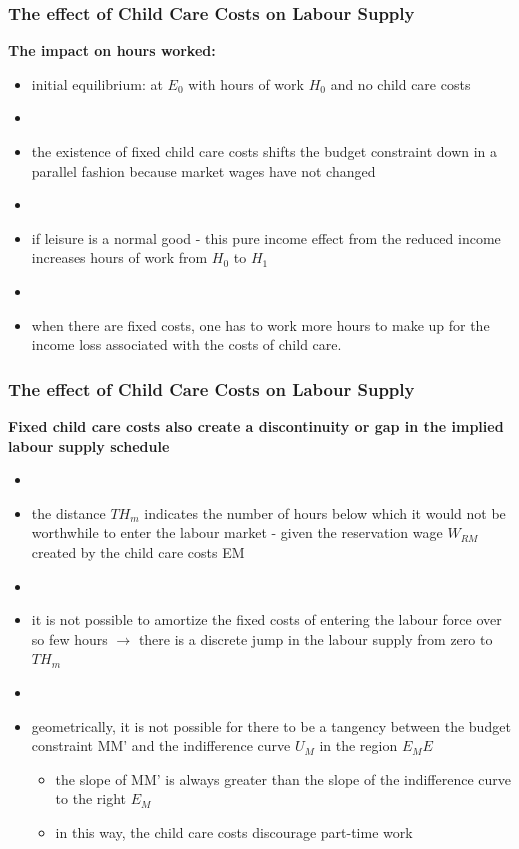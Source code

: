 \documentclass[aspectratio=169]{beamer}
\begin{document}
 
    \begin{frame}
  \frametitle{The effect of Child Care Costs on Labour Supply}
\textbf{The impact on hours worked:}

\begin{itemize}

\item initial equilibrium:  at $E_{0}$ with hours of work $H_{0}$  and no child care costs
\item[]
\item the existence of fixed child care costs shifts the budget constraint down in a parallel fashion because market wages have not changed

\item[]
\item if leisure is a normal good - this pure income effect from the reduced income increases hours of work from $H_{0}$ to $H_{1}$ 
\item[]
\item when there are fixed costs, one has to work more hours to make up for the income loss associated with the costs of child care.

\end{itemize}

\end{frame}  
 
 
     \begin{frame}
  \frametitle{The effect of Child Care Costs on Labour Supply}



\textbf{Fixed child care costs also create a discontinuity or gap in the implied labour supply schedule}

\begin{itemize}
\item[]
\item the distance $TH_{m}$ indicates the number of hours below which it would not be worthwhile to enter the labour market - given the reservation wage $W_{RM}$ created by the child care costs EM

\item[]
\item it is not possible to amortize the fixed costs of entering the labour force over so few hours $\rightarrow$ there is a discrete jump in the labour supply from zero to $TH_{m}$ 
\item[]
\item geometrically,  it is not possible for there to be a tangency between the budget constraint MM' and the indifference curve $U_{M}$ in the region $E_{M}E$

\begin{itemize}
\item the slope of MM' is always greater than the slope of the indifference curve to the right $E_{M}$
\item in this way,  the child care costs discourage part-time work
\end{itemize}

\end{itemize}

\end{frame}  
 
\end{document}
